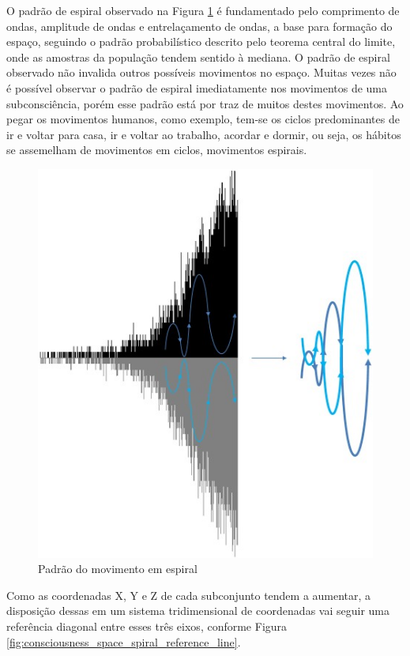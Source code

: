 O padrão de espiral observado na Figura \ref{fig:consciousness_space_spiral} é fundamentado pelo comprimento de ondas, amplitude de ondas e entrelaçamento de ondas, a base para formação do espaço, seguindo o padrão probabilístico descrito pelo teorema central do limite, onde as amostras da população tendem sentido à mediana. O padrão de espiral observado não invalida outros possíveis movimentos no espaço. Muitas vezes não é possível observar o padrão de espiral imediatamente nos movimentos de uma subconsciência, porém esse padrão está por traz de muitos destes movimentos. Ao pegar os movimentos humanos, como exemplo, tem-se os ciclos predominantes de ir e voltar para casa, ir e voltar ao trabalho, acordar e dormir, ou seja, os hábitos se assemelham de movimentos em ciclos, movimentos espirais.
	\begin{figure}[H]
	\caption{Padrão do movimento em espiral}
	\label{fig:consciousness_space_spiral}
	\centering
	\includegraphics[scale=.6]{sections/images/consciousness_space_spiral.jpg}
	\end{figure}

Como as coordenadas X, Y e Z de cada subconjunto tendem a aumentar, a disposição dessas em um sistema tridimensional de coordenadas vai seguir uma referência diagonal entre esses três eixos, conforme Figura \ref{fig:consciousness_space_spiral_reference_line}.

